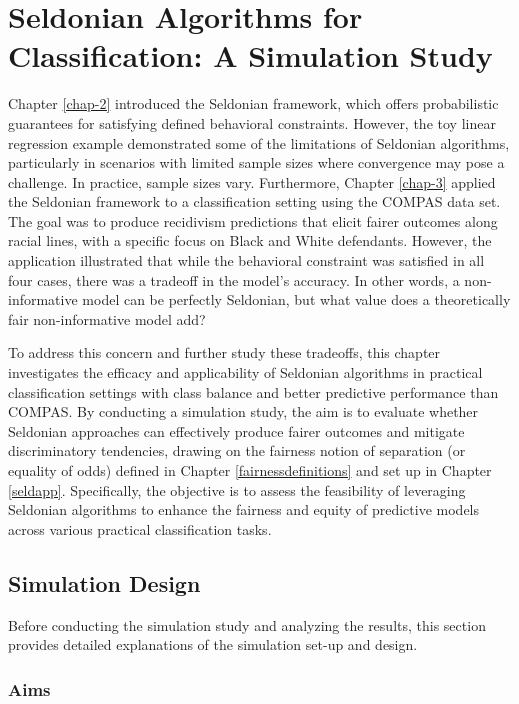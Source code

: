 \documentclass[12pt, twoside]{amherstthesis}
\begin{document}
\hypertarget{chap-4}{%
\chapter{Seldonian Algorithms for Classification: A Simulation Study}\label{chap-4}}

Chapter \ref{chap-2} introduced the Seldonian framework, which offers probabilistic guarantees for satisfying defined behavioral constraints. However, the toy linear regression example demonstrated some of the limitations of Seldonian algorithms, particularly in scenarios with limited sample sizes where convergence may pose a challenge. In practice, sample sizes vary. Furthermore, Chapter \ref{chap-3} applied the Seldonian framework to a classification setting using the COMPAS data set. The goal was to produce recidivism predictions that elicit fairer outcomes along racial lines, with a specific focus on Black and White defendants. However, the application illustrated that while the behavioral constraint was satisfied in all four cases, there was a tradeoff in the model's accuracy. In other words, a non-informative model can be perfectly Seldonian, but what value does a theoretically fair non-informative model add?

To address this concern and further study these tradeoffs, this chapter investigates the efficacy and applicability of Seldonian algorithms in practical classification settings with class balance and better predictive performance than COMPAS. By conducting a simulation study, the aim is to evaluate whether Seldonian approaches can effectively produce fairer outcomes and mitigate discriminatory tendencies, drawing on the fairness notion of separation (or equality of odds) defined in Chapter \ref{fairnessdefinitions} and set up in Chapter \ref{seldapp}. Specifically, the objective is to assess the feasibility of leveraging Seldonian algorithms to enhance the fairness and equity of predictive models across various practical classification tasks.

\hypertarget{sim-design}{%
\section{Simulation Design}\label{sim-design}}

Before conducting the simulation study and analyzing the results, this section provides detailed explanations of the simulation set-up and design.

\hypertarget{aims}{%
\subsection{Aims}\label{aims}}
\end{document}
